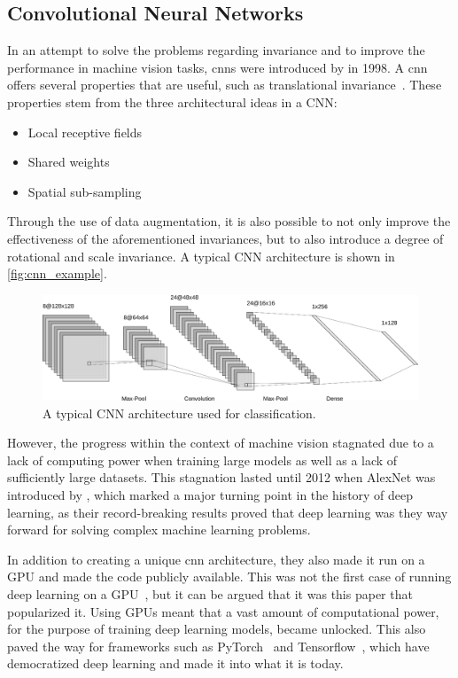\subsection{Convolutional Neural Networks}
In an attempt to solve the problems regarding invariance and to improve the performance in machine vision tasks, \glspl*{cnn} were introduced by \textcite{cnn} in 1998. A \gls*{cnn} offers several properties that are useful, such as translational invariance~\cite{cnn}. These properties stem from the three architectural ideas in a CNN:
\begin{itemize}
    \item Local receptive fields
    \item Shared weights
    \item Spatial sub-sampling
\end{itemize}
Through the use of data augmentation, it is also possible to not only improve the effectiveness of the aforementioned invariances, but to also introduce a degree of rotational and scale invariance. A typical CNN architecture is shown in \autoref{fig:cnn_example}.
\begin{figure}[H]
    \centering
    \includegraphics[width=\linewidth]{resources/related_works/cnn}
    \caption[Typical CNN Architecture]{ A typical CNN architecture used for classification. }
    \label{fig:cnn_example}
\end{figure}
\par
However, the progress within the context of machine vision stagnated due to a lack of computing power when training large models as well as a lack of sufficiently large datasets. This stagnation lasted until 2012 when AlexNet was introduced by \textcite{alexnet}, which marked a major turning point in the history of deep learning, as their record-breaking results proved that deep learning was they way forward for solving complex machine learning problems.
\par
In addition to creating a unique \gls*{cnn} architecture, they also made it run on a GPU and made the code publicly available. This was not the first case of running deep learning on a GPU~\cite{deeplearning_gpu}, but it can be argued that it was this paper that popularized it.  Using GPUs meant that a vast amount of computational power, for the purpose of training deep learning models, became unlocked. This also paved the way for frameworks such as PyTorch~\cite{pytorch} and Tensorflow~\cite{tensorflow}, which have democratized deep learning and made it into what it is today.
